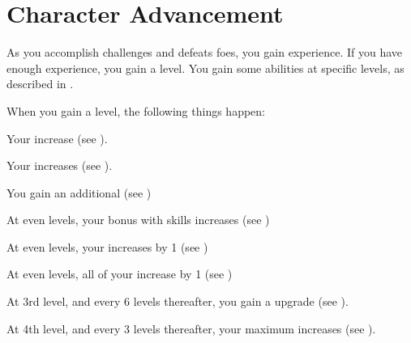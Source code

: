 \section{Character Advancement}\label{Character Advancement}

    As you accomplish challenges and defeats foes, you gain experience.
    If you have enough experience, you gain a level.
    You gain some abilities at specific levels, as described in .

    When you gain a level, the following things happen:
    \begin{raggeditemize}
        \item Your  increase (see ).
        \item Your  increases (see ).
        \item You gain an additional  (see )
        \item At even levels, your bonus with  skills increases (see )
        \item At even levels, your  increases by 1 (see )
        \item At even levels, all of your  increase by 1 (see )
        \item At 3rd level, and every 6 levels thereafter, you gain a  upgrade (see ).
        \item At 4th level, and every 3 levels thereafter, your maximum  increases (see ).
    \end{raggeditemize}


